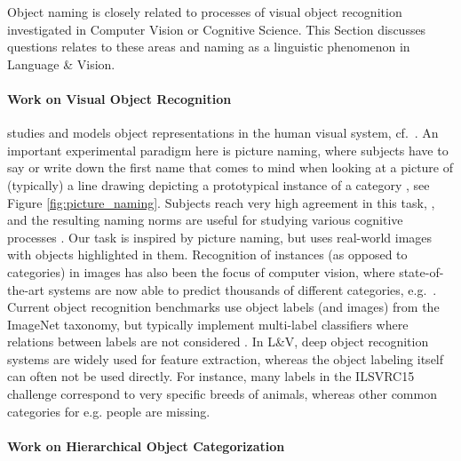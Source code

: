 
Object naming is closely related to processes of visual object recognition investigated in Computer Vision or Cognitive Science.
This Section discusses questions relates to these areas and naming as a linguistic phenomenon in Language \& Vision.



\paragraph{Work on Visual Object Recognition} studies and models object representations in the human visual system, cf.\ \cite{regan2000human,rossion2004revisiting}. 
An important experimental paradigm here is picture naming, where subjects have to say or write down the first name that comes to mind when looking at a picture of (typically) a line drawing depicting a prototypical instance of a category \cite{snodgrass}, see Figure \ref{fig:picture_naming}.
Subjects reach very high agreement in this task, \cite{rossion2004revisiting}, and the resulting naming norms are useful for studying various cognitive processes \cite{humphreys1988cascade}.
Our task is inspired by picture naming, but uses real-world images with objects highlighted in them.
Recognition of instances (as opposed to categories) in images has also been the focus of computer vision, where state-of-the-art systems are now able to predict thousands of different categories, e.g.\  . 
Current object recognition benchmarks use object labels (and images) from the ImageNet \cite{imagenet_cvpr09} taxonomy, but typically implement multi-label classifiers where relations between labels are not considered \cite{ILSVRC15}. 
In L\&V,  deep object recognition systems are widely used for feature extraction, whereas the object labeling itself can often not be used directly. For instance, many labels in the ILSVRC15 challenge correspond to very specific breeds of animals, whereas other common categories  for e.g. people are missing.


\paragraph{Work on Hierarchical Object Categorization} 


